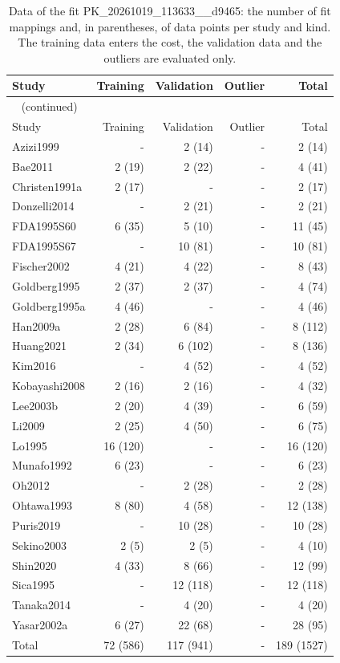 \documentclass{article}
\begin{document}
\begin{longtable}{lrrrr}
\caption{Data of the fit PK\_20261019\_113633\_\_d9465: the number of fit mappings and, in parentheses, of data points per study and kind. The training data enters the cost, the validation data and the outliers are evaluated only.}\label{tab:data:PK_20261019_113633__d9465} \\
\toprule
Study & Training & Validation & Outlier & Total \\
\midrule
\endfirsthead
\multicolumn{5}{l}{\small\tablename~\thetable{} (continued)} \\
\toprule
Study & Training & Validation & Outlier & Total \\
\midrule
\endhead
\bottomrule
\endlastfoot
Azizi1999 & - & 2 (14) & - & 2 (14) \\
Bae2011 & 2 (19) & 2 (22) & - & 4 (41) \\
Christen1991a & 2 (17) & - & - & 2 (17) \\
Donzelli2014 & - & 2 (21) & - & 2 (21) \\
FDA1995S60 & 6 (35) & 5 (10) & - & 11 (45) \\
FDA1995S67 & - & 10 (81) & - & 10 (81) \\
Fischer2002 & 4 (21) & 4 (22) & - & 8 (43) \\
Goldberg1995 & 2 (37) & 2 (37) & - & 4 (74) \\
Goldberg1995a & 4 (46) & - & - & 4 (46) \\
Han2009a & 2 (28) & 6 (84) & - & 8 (112) \\
Huang2021 & 2 (34) & 6 (102) & - & 8 (136) \\
Kim2016 & - & 4 (52) & - & 4 (52) \\
Kobayashi2008 & 2 (16) & 2 (16) & - & 4 (32) \\
Lee2003b & 2 (20) & 4 (39) & - & 6 (59) \\
Li2009 & 2 (25) & 4 (50) & - & 6 (75) \\
Lo1995 & 16 (120) & - & - & 16 (120) \\
Munafo1992 & 6 (23) & - & - & 6 (23) \\
Oh2012 & - & 2 (28) & - & 2 (28) \\
Ohtawa1993 & 8 (80) & 4 (58) & - & 12 (138) \\
Puris2019 & - & 10 (28) & - & 10 (28) \\
Sekino2003 & 2 (5) & 2 (5) & - & 4 (10) \\
Shin2020 & 4 (33) & 8 (66) & - & 12 (99) \\
Sica1995 & - & 12 (118) & - & 12 (118) \\
Tanaka2014 & - & 4 (20) & - & 4 (20) \\
Yasar2002a & 6 (27) & 22 (68) & - & 28 (95) \\
Total & 72 (586) & 117 (941) & - & 189 (1527) \\
\end{longtable}
\end{document}
